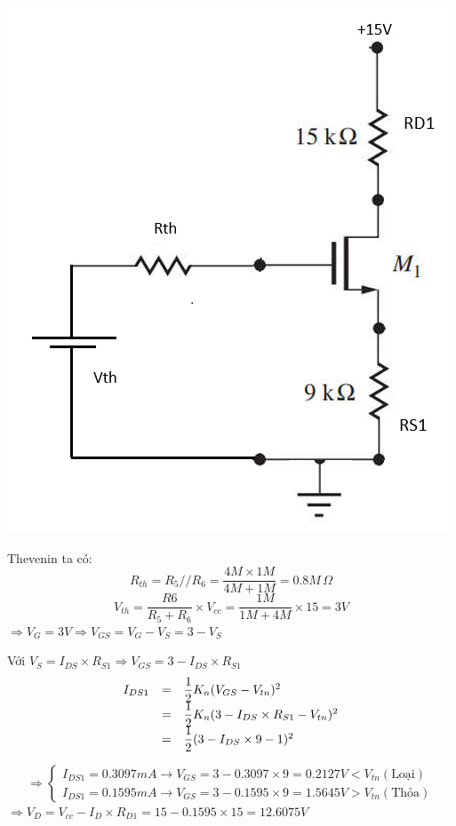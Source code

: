 \begin{itemize}[label=-]
\begin{minipage}{0.4\linewidth}
		\includegraphics[width=.8\linewidth]{./my-chapters/my-images/Question6/DC_tang1 - Copy.png}
	\end{minipage}
	
	Thevenin ta có:
		\[ R_{th} = R_{5}//R_{6} = \dfrac{4M \times 1M}{4M + 1M} = 0.8M \,\Omega \]
		\[ V_{th} = \dfrac{R6}{R_{5} + R_{6}}\times V_{cc} = \dfrac{1M}{1M + 4M}\times 15 = 3V\]
		$\Rightarrow V_{G} = 3V \Rightarrow V_{GS} = V_{G} - V_{S} = 3 - V_{S}$
		
		Với $V_{S} = I_{DS} \times R_{S1} \Rightarrow V_{GS} = 3 - I_{DS}\times R_{S1}$
		\[ \begin{matrix}
			I_{DS1} & = & \dfrac{1}{2} K_{n} (V_{GS} - V_{tn})^{2} \hfill \\
			       & = & \dfrac{1}{2} K_{n} (3 - I_{DS}\times R_{S1} - V_{tn})^{2} \hfill \\
			       & = & \dfrac{1}{2} (3 - I_{DS}\times 9 - 1)^{2} \hfill \\ 
		\end{matrix}
		\]
		
		\[ \Rightarrow
		\begin{cases}
			I_{DS1} = 0.3097mA \rightarrow V_{GS} = 3 - 0.3097\times 9 = 0.2127V < V_{tn}(\text{Loại}) \\
			I_{DS1} = 0.1595mA \rightarrow V_{GS} = 3 - 0.1595\times 9 = 1.5645V > V_{tn}(\text{Thỏa})
		\end{cases}\]
		$ \Rightarrow V_{D} = V_{cc} - I_{D} \times R_{D1} = 15 - 0.1595\times 15 = 12.6075V $
		

\end{itemize}
